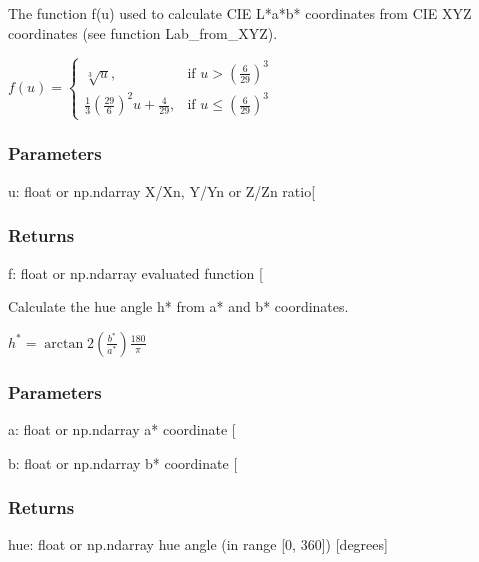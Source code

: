 \documentclass[letterpaper,10pt,english]{sphinxmanual}
\begin{document}
\begin{fulllineitems}
\label{\detokenize{07_colors:skinoptics.colors.f_Lab_from_XYZ}}
\pysigstartsignatures
{}
\pysigstopsignatures
\sphinxAtStartPar
The function f(u) used to calculate CIE L*a*b* coordinates from CIE XYZ coordinates (see function Lab\_from\_XYZ).

\sphinxAtStartPar
\(f(u) = \left\{ 
\begin{matrix}
\sqrt[3]{u}, & \mbox{if }  u > \left(\frac{6}{29}\right)^3 \\
\frac{1}{3}\left(\frac{29}{6}\right)^2 u + \frac{4}{29}, & \mbox{if }  u \le \left(\frac{6}{29}\right)^3
\end{matrix}\right.\)


\subsubsection{Parameters}
\label{\detokenize{07_colors:id23}}
\sphinxAtStartPar
u: float or np.ndarray
X/Xn, Y/Yn or Z/Zn ratio{[}\sphinxhyphen{}{]}


\subsubsection{Returns}
\label{\detokenize{07_colors:id24}}
\sphinxAtStartPar
f: float or np.ndarray
evaluated function {[}\sphinxhyphen{}{]}

\end{fulllineitems}


\begin{fulllineitems}
\label{\detokenize{07_colors:skinoptics.colors.hue}}
\pysigstartsignatures
{}
\pysigstopsignatures
\sphinxAtStartPar
Calculate the hue angle h* from a* and b* coordinates.

\sphinxAtStartPar
\(h^* = \arctan 2\left(\frac{b^*}{a^*}\right)\frac{180}{\pi}\)


\subsubsection{Parameters}
\label{\detokenize{07_colors:id25}}
\sphinxAtStartPar
a: float or np.ndarray
a* coordinate {[}\sphinxhyphen{}{]}

\sphinxAtStartPar
b: float or np.ndarray
b* coordinate {[}\sphinxhyphen{}{]}


\subsubsection{Returns}
\label{\detokenize{07_colors:id26}}
\sphinxAtStartPar
hue: float or np.ndarray
hue angle (in range {[}0, 360{]}) {[}degrees{]}

\end{fulllineitems}
\end{document}
